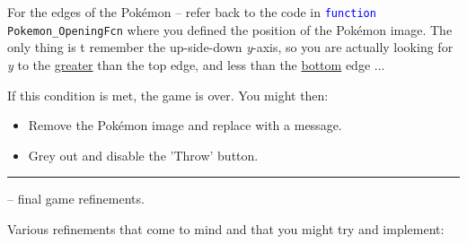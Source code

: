\documentclass{tufte-book} %
\begin{document}
For the edges of the Pok\'emon -- refer back to the code in \texttt{\textcolor{blue}{function} Pokemon\_OpeningFcn} where you defined the position of the Pok\'emon image. The only thing is t remember the up-side-down \textit{y}-axis, so you are actually looking for \textit{y} to the \uline{greater} than the top edge, and less than the \uline{bottom} edge ...

If this condition is met, the game is over. You might then:
\begin{itemize}[noitemsep]
\setlength{\itemindent}{.2in}
\item Remove the Pok\'emon image and replace with a message.
\item Grey out and disable the 'Throw' button.
\end{itemize}

\vspace{1mm}
\noindent\rule{4cm}{0.5pt}
\vspace{-2mm}

 -- final game refinements.

\noindent Various refinements that come to mind and that you might try and implement:
\vspace{-2mm}
\end{document}
